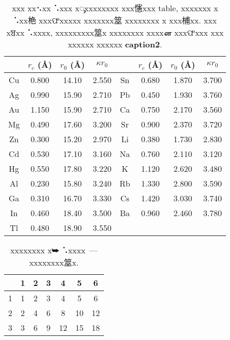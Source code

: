 \documentclass[
aps,%
12pt,%
final,%
notitlepage,%
oneside,%
onecolumn,%
nobibnotes,%
nofootinbib,%
superscriptaddress,%
noshowpacs,%
centertags]%
{revtex4}
\begin{document}
\pagebreak

\begin{table}[p]
\setcaptionmargin{0mm} \onelinecaptionsfalse
{} \caption{ xxx xx⠢xx ⠡xxx
xᯮxxxxxxxx xxx㦥xxx table, xxxxxxx x ⠡xx栬 xxxଫxxxxx
xxxxxxx筮 xxxxxxxx x xxx㭪xx. xxx xਬxx ⠡xxxx, xxxxxxxxx筮x
xxxxxxxx xxxxன xxxଫxxx xxx xxxxxx xxxxxx \textbf{caption2}.}
\bigskip
\begin{tabular}{|c|c|c|c|c|c|c|c|}
\hline
 &$r_c$ (\AA)&$r_0$ (\AA)&$\kappa r_0$&
 &$r_c$ (\AA) &$r_0$ (\AA)&$\kappa r_0$\\
\hline
Cu& 0.800 & 14.10 & 2.550 &Sn
& 0.680 & 1.870 & 3.700 \\
Ag& 0.990 & 15.90 & 2.710 &Pb
& 0.450 & 1.930 & 3.760 \\
Au& 1.150 & 15.90 & 2.710 &Ca
& 0.750 & 2.170 & 3.560 \\
Mg& 0.490 & 17.60 & 3.200 &Sr
& 0.900 & 2.370 & 3.720 \\
Zn& 0.300 & 15.20 & 2.970 &Li
& 0.380 & 1.730 & 2.830 \\
Cd& 0.530 & 17.10 & 3.160 &Na
& 0.760 & 2.110 & 3.120 \\
Hg& 0.550 & 17.80 & 3.220 &K &  1.120 & 2.620 & 3.480 \\
Al& 0.230 & 15.80 & 3.240 &Rb & 1.330 & 2.800 & 3.590 \\
Ga& 0.310 & 16.70 & 3.330 &Cs & 1.420 & 3.030 & 3.740 \\
In& 0.460 & 18.40 & 3.500 &Ba & 0.960 & 2.460 & 3.780 \\
Tl& 0.480 & 18.90 & 3.550 & & & & \\[1mm]
\hline
\end{tabular}
\end{table}

\begin{table}[!h]
\setcaptionmargin{0mm}
\onelinecaptionstrue
{}
\caption{xxxxxxxx x⮩ ⠡xxxx~--- xxxxxxxx筮x.}
\bigskip
\begin{tabular}{|c|c|c|c|c|c|c|}
  \hline
    & 1 & 2 & 3 & 4 & 5 & 6\\
  \hline
  1 & 1 & 2 & 3 & 4 & 5 & 6\\
  2 & 2 & 4 & 6 & 8 & 10 & 12\\
  3 & 3 & 6 & 9 & 12 & 15 & 18\\[1mm]
  \hline
\end{tabular}
\end{table}
\end{document}
